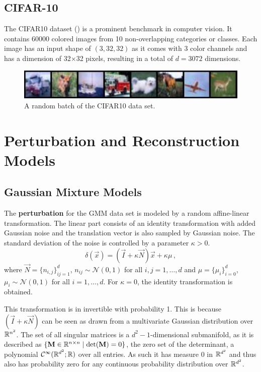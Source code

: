 \subsection{CIFAR-10}
The CIFAR10 dataset (\cite{CIFAR}) is a prominent benchmark in computer vision. 
It contains 60000 colored images from 10 non-overlapping categories or classes.
Each image has an input shape of $(3, 32, 32)$ as it comes with 3 color channels 
and has a dimension of 32$\times$32 pixels, resulting in a total of $d=3072$ dimensions.
\begin{figure}[h]
    \centering
    \includegraphics{figures/CIFAR10_plot.pdf}
    \caption{A random batch of the CIFAR10 data set.}
    \label{fig:CIFAR10_plot}
\end{figure}





\section{Perturbation and Reconstruction Models}
\label{sec:reconstruction_models}


\subsection{Gaussian Mixture Models}

The \textbf{perturbation} for the GMM data set is modeled by
a random affine-linear transformation.
The linear part consists of an identity transformation with added Gaussian noise
and the translation vector is also sampled by Gaussian noise.
The standard deviation of the noise is controlled by a parameter $\kappa > 0$.
\[
    \delta(\vec x) = (\vec I + \kappa \vec N)\vec x + \kappa \mu \,,
\]
where $\vec N = \{n_{i, j}\}_{i j = 1}^{d}$, $n_{ij} \sim \mathcal N (0, 1)$ for all $i, j = 1 , \ldots, d$
and 
$\mu = \{\mu_i\}_{i=0}^d$, $\mu_i \sim \mathcal N(0, 1)$ for all $i=1,\ldots,d$.
For $\kappa = 0$, the identity transformation is obtained.

This transformation is in invertible with probability 1.
This is because $(\vec I + \kappa \vec N)$ can be seen as drawn 
from a multivariate Gaussian distribution over $\mathbb{R}^{n^2}$.
The set of all singular matrices is a $d^2-1$-dimensional submanifold,
as it is described as $\{\mathbf M \in \mathbb{R}^{n\times n} \mid \det(\mathbf M) = 0\}$, 
the zero set of the determinant,
a polynomial $\mathcal C^{\infty}(\mathbb{R}^{d^2};\mathbb{R})$ over all entries.
As such it has measure 0 in $\mathbb{R}^{d^2}$ and thus also has probability zero
for any continuous probability distribution over $\mathbb{R}^{d^2}$.


